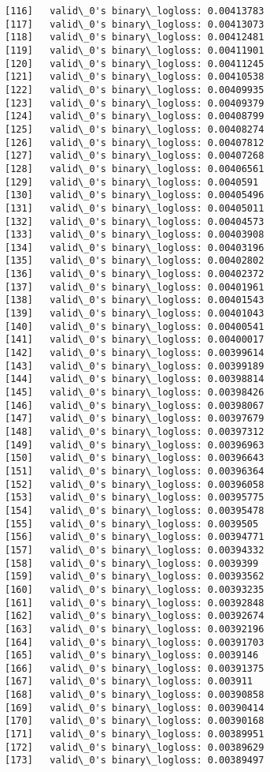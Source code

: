 \documentclass[11pt]{article}
\begin{document}
\begin{Verbatim}[commandchars=\\\{\}]
[116]	valid\_0's binary\_logloss: 0.00413783
[117]	valid\_0's binary\_logloss: 0.00413073
[118]	valid\_0's binary\_logloss: 0.00412481
[119]	valid\_0's binary\_logloss: 0.00411901
[120]	valid\_0's binary\_logloss: 0.00411245
[121]	valid\_0's binary\_logloss: 0.00410538
[122]	valid\_0's binary\_logloss: 0.00409935
[123]	valid\_0's binary\_logloss: 0.00409379
[124]	valid\_0's binary\_logloss: 0.00408799
[125]	valid\_0's binary\_logloss: 0.00408274
[126]	valid\_0's binary\_logloss: 0.00407812
[127]	valid\_0's binary\_logloss: 0.00407268
[128]	valid\_0's binary\_logloss: 0.00406561
[129]	valid\_0's binary\_logloss: 0.0040591
[130]	valid\_0's binary\_logloss: 0.00405496
[131]	valid\_0's binary\_logloss: 0.00405011
[132]	valid\_0's binary\_logloss: 0.00404573
[133]	valid\_0's binary\_logloss: 0.00403908
[134]	valid\_0's binary\_logloss: 0.00403196
[135]	valid\_0's binary\_logloss: 0.00402802
[136]	valid\_0's binary\_logloss: 0.00402372
[137]	valid\_0's binary\_logloss: 0.00401961
[138]	valid\_0's binary\_logloss: 0.00401543
[139]	valid\_0's binary\_logloss: 0.00401043
[140]	valid\_0's binary\_logloss: 0.00400541
[141]	valid\_0's binary\_logloss: 0.00400017
[142]	valid\_0's binary\_logloss: 0.00399614
[143]	valid\_0's binary\_logloss: 0.00399189
[144]	valid\_0's binary\_logloss: 0.00398814
[145]	valid\_0's binary\_logloss: 0.00398426
[146]	valid\_0's binary\_logloss: 0.00398067
[147]	valid\_0's binary\_logloss: 0.00397679
[148]	valid\_0's binary\_logloss: 0.00397312
[149]	valid\_0's binary\_logloss: 0.00396963
[150]	valid\_0's binary\_logloss: 0.00396643
[151]	valid\_0's binary\_logloss: 0.00396364
[152]	valid\_0's binary\_logloss: 0.00396058
[153]	valid\_0's binary\_logloss: 0.00395775
[154]	valid\_0's binary\_logloss: 0.00395478
[155]	valid\_0's binary\_logloss: 0.0039505
[156]	valid\_0's binary\_logloss: 0.00394771
[157]	valid\_0's binary\_logloss: 0.00394332
[158]	valid\_0's binary\_logloss: 0.0039399
[159]	valid\_0's binary\_logloss: 0.00393562
[160]	valid\_0's binary\_logloss: 0.00393235
[161]	valid\_0's binary\_logloss: 0.00392848
[162]	valid\_0's binary\_logloss: 0.00392674
[163]	valid\_0's binary\_logloss: 0.00392196
[164]	valid\_0's binary\_logloss: 0.00391703
[165]	valid\_0's binary\_logloss: 0.0039146
[166]	valid\_0's binary\_logloss: 0.00391375
[167]	valid\_0's binary\_logloss: 0.003911
[168]	valid\_0's binary\_logloss: 0.00390858
[169]	valid\_0's binary\_logloss: 0.00390414
[170]	valid\_0's binary\_logloss: 0.00390168
[171]	valid\_0's binary\_logloss: 0.00389951
[172]	valid\_0's binary\_logloss: 0.00389629
[173]	valid\_0's binary\_logloss: 0.00389497

\end{Verbatim}
\end{document}
